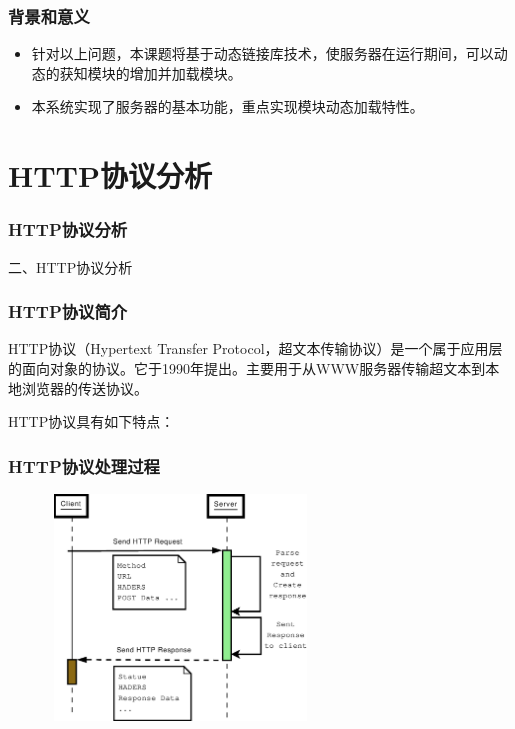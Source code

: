 \documentclass[10pt,dvipdfm]{beamer}
\begin{document}
\begin{frame}
	\frametitle{背景和意义}
	\begin{block}{}
	\begin{itemize}
		\item 针对以上问题，本课题将基于动态链接库技术，使服务器在运行期间，可以动态的获知模块的增加并加载模块。
		\item 本系统实现了服务器的基本功能，重点实现模块动态加载特性。
	\end{itemize}
	\end{block}
\end{frame}

\section{HTTP协议分析}

\begin{frame}
	\frametitle{HTTP协议分析}
	\begin{center}
	{\Large
		二、HTTP协议分析
	}
	\end{center}
\end{frame}

\begin{frame}
	\frametitle{HTTP协议简介}
	
HTTP协议（Hypertext Transfer Protocol，超文本传输协议）是一个属于应用层的面向对象的协议。它于1990年提出。主要用于从WWW服务器传输超文本到本地浏览器的传送协议。

 	\pause

\begin{block}{HTTP协议具有如下特点：}
\end{block}
\end{frame}

\begin{frame}
	\frametitle{HTTP协议处理过程}
	\begin{figure}[htbp]
	\centering
	\includegraphics[height=6cm, width=7cm]{http.eps}
	\end{figure}
\end{frame}
\end{document}
